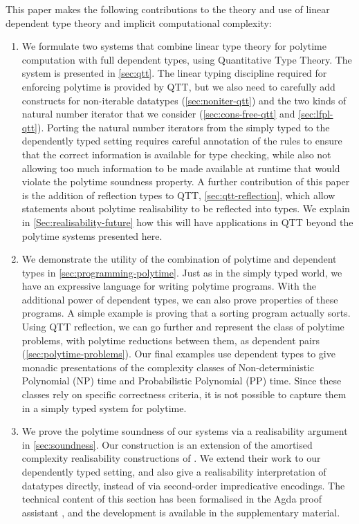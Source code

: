 \documentclass[acmsmall,review,screen,anonymous]{acmart}
\begin{document}
This paper makes the following contributions to the theory and use of
linear dependent type theory and implicit computational complexity:
\begin{enumerate}
\item We formulate two systems that combine linear type theory for
  polytime computation with full dependent types, using Quantitative
  Type Theory. The system is presented in \autoref{sec:qtt}. The
  linear typing discipline required for enforcing polytime is provided
  by QTT, but we also need to carefully add constructs for
  non-iterable datatypes (\autoref{sec:noniter-qtt}) and the two kinds
  of natural number iterator that we consider
  (\autoref{sec:cons-free-qtt} and \autoref{sec:lfpl-qtt}). Porting
  the natural number iterators from the simply typed to the
  dependently typed setting requires careful annotation of the rules
  to ensure that the correct information is available for type
  checking, while also not allowing too much information to be made
  available at runtime that would violate the polytime soundness
  property. A further contribution of this paper is the addition of
  reflection types to QTT, \autoref{sec:qtt-reflection}, which allow
  statements about polytime realisability to be reflected into
  types. We explain in \autoref{Sec:realisability-future} how this
  will have applications in QTT beyond the polytime systems presented
  here.
\item We demonstrate the utility of the combination of polytime and
  dependent types in \autoref{sec:programming-polytime}. Just as in
  the simply typed world, we have an expressive language for writing
  polytime programs. With the additional power of dependent types, we
  can also prove properties of these programs. A simple example is
  proving that a sorting program actually sorts. Using QTT reflection,
  we can go further and represent the class of polytime problems, with
  polytime reductions between them, as dependent pairs
  (\autoref{sec:polytime-problems}). Our final examples use dependent
  types to give monadic presentations of the complexity classes of
  Non-deterministic Polynomial (NP) time and Probabilistic Polynomial
  (PP) time. Since these classes rely on specific correctness
  criteria, it is not possible to capture them in a simply typed
  system for polytime.
\item We prove the polytime soundness of our systems via a
  realisability argument in \autoref{sec:soundness}. Our construction
  is an extension of the amortised complexity realisability
  constructions of \cite{hofmann-dallago}. We extend their work to our
  dependently typed setting, and also give a realisability
  interpretation of datatypes directly, instead of via second-order
  impredicative encodings. The technical content of this section has
  been formalised in the Agda proof assistant \cite{agda}, and the
  development is available in the supplementary material.
\end{enumerate}
\end{document}
